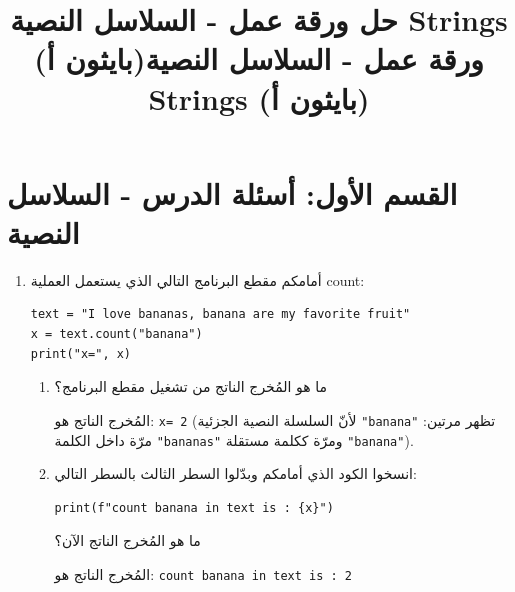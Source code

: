 \documentclass[14pt]{extarticle}
\title{حل ورقة عمل - السلاسل النصية \textenglish{Strings} (بايثون أ)}
\title{ورقة عمل - السلاسل النصية \textenglish{Strings} (بايثون أ)}
\begin{document}
\maketitle
\thispagestyle{fancy}

\section*{القسم الأول: أسئلة الدرس - السلاسل النصية}

\begin{enumerate}[label=\textbf{تمرين \arabic*:}, wide=0pt, itemsep=2.2em]

\item أمامكم مقطع البرنامج التالي الذي يستعمل العملية \textenglish{count}:

\begin{boxCode}
\begin{english}
\begin{verbatim}
text = "I love bananas, banana are my favorite fruit"
x = text.count("banana")
print("x=", x)
\end{verbatim}
\end{english}
\end{boxCode}

\begin{enumerate}[label=\alph*.]
\item ما هو المُخرج الناتج من تشغيل مقطع البرنامج؟
\ifwithsols
\begin{boxSolution}
المُخرج الناتج هو: \textenglish{\texttt{x= 2}} (لأنّ السلسلة النصية الجزئية \textenglish{\texttt{"banana"}} تظهر مرتين: مرّة داخل الكلمة \textenglish{\texttt{"bananas"}} ومرّة ككلمة مستقلة \textenglish{\texttt{"banana"}}).
\end{boxSolution}
\fi
\filbreak

\item انسخوا الكود الذي أمامكم وبدّلوا السطر الثالث بالسطر التالي:
\begin{boxCode}
\begin{english}
\begin{verbatim}
print(f"count banana in text is : {x}")
\end{verbatim}
\end{english}
\end{boxCode}
ما هو المُخرج الناتج الآن؟
\ifwithsols
\begin{boxSolution}
المُخرج الناتج هو: \textenglish{\texttt{count banana in text is : 2}}
\end{boxSolution}
\fi
\filbreak
\end{enumerate}
\filbreak


\end{enumerate}
\end{document}
